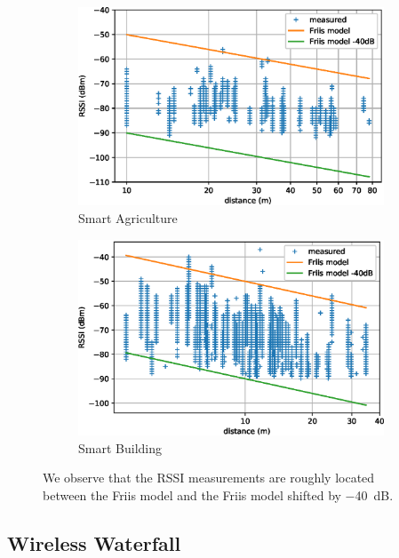 \documentclass{elsarticle}
\newcommand{\building}            {Smart Building\xspace}
\newcommand{\agri}                {Smart Agriculture\xspace}
\begin{document}
\begin{figure}
    \centering
    \begin{subfigure}[h]{0.49\textwidth}
        \includegraphics[width=\textwidth]{pister_hack_agri.eps}
        \caption{\agri}
    \end{subfigure}
    \begin{subfigure}[h]{0.49\textwidth}  
        \includegraphics[width=\textwidth]{pister_hack_building.eps}
        \caption{\building}
    \end{subfigure} 
    \caption{We observe that the RSSI measurements are roughly located between the Friis model and the Friis model shifted by $-$40~dB.}
    \label{fig:pister_hack}
\end{figure}

\subsection{Wireless Waterfall}
\label{sec:waterfall}
\end{document}
